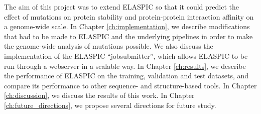 The aim of this project was to extend ELASPIC so that it could predict the effect of mutations on protein stability and protein-protein interaction affinity on a genome-wide scale. In Chapter \ref{ch:implementation}, we describe modifications that had to be made to ELASPIC and the underlying pipelines in order to make the genome-wide analysis of mutations possible. We also discuss the implementation of the ELASPIC ``jobsubmitter'', which allows ELASPIC to be run through a webserver in a scalable way. In Chapter \ref{ch:results}, we describe the performance of ELASPIC on the training, validation and test datasets, and compare its performance to other sequence- and structure-based tools. In Chapter \ref{ch:discussion}, we discuss the results of this work. In Chapter \ref{ch:future_directions}, we propose several directions for future study.

